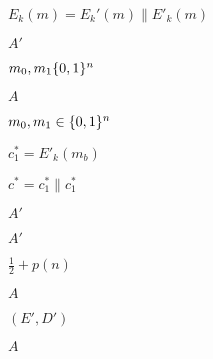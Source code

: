 \documentclass[10pt]{book}
\begin{document}
\begin{mdSnippets}
\begin{mdInlineSnippet}[526338569f6c56f089d9017776a6fdbc]
$E_k(m) = E_k'(m) \| E'_{k}(m)$\end{mdInlineSnippet}%
\begin{mdInlineSnippet}[37a12b78a9ca96989ad7ceceacb37ea2]%
$A'$\end{mdInlineSnippet}%
\begin{mdInlineSnippet}[2c8bb31e370a144e936a08cc6e79f38b]%
$m_0,m_1 \{0,1\}^n$\end{mdInlineSnippet}%
\begin{mdInlineSnippet}[7fc56270e7a70fa81a5935b72eacbe29]%
$A$\end{mdInlineSnippet}%
\begin{mdInlineSnippet}%
$m_0,m_1 \in \{0,1\}^n$\end{mdInlineSnippet}%
\begin{mdInlineSnippet}%
$c_1^* = E'_k(m_b)$\end{mdInlineSnippet}%
\begin{mdInlineSnippet}[39c06c0b880a5e44657ffd38b943de8a]%
$c^* = c_1^* \| c_1^*$\end{mdInlineSnippet}%
\begin{mdInlineSnippet}[37a12b78a9ca96989ad7ceceacb37ea2]%
$A'$\end{mdInlineSnippet}%
\begin{mdInlineSnippet}[37a12b78a9ca96989ad7ceceacb37ea2]%
$A'$\end{mdInlineSnippet}%
\begin{mdInlineSnippet}[64f5991003da134cc68fa343d048ebac]%
$\frac{1}{2} + p(n)$\end{mdInlineSnippet}%
\begin{mdInlineSnippet}[7fc56270e7a70fa81a5935b72eacbe29]%
$A$\end{mdInlineSnippet}%
\begin{mdInlineSnippet}%
$(E',D')$\end{mdInlineSnippet}%
\begin{mdInlineSnippet}[7fc56270e7a70fa81a5935b72eacbe29]%
$A$\end{mdInlineSnippet}%
\begin{mdInlineSnippet}[c150726dc018e82825c0c3617f46a1c9]%

\end{mdInlineSnippet}
\end{mdSnippets}
\end{document}
